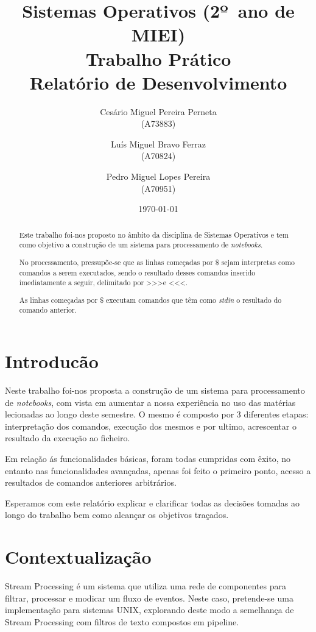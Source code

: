 \documentclass{report}
\title{Sistemas Operativos (2º\ ano de MIEI)\\ \textbf{Trabalho Prático  }\\ Relatório de Desenvolvimento}
\author{Cesário Miguel Pereira Perneta\\ (A73883) \and Luís Miguel Bravo Ferraz\\ (A70824) \and Pedro Miguel Lopes Pereira\\ (A70951) }
\date {\today }
\begin{document}
\maketitle

\begin{abstract}

\indent Este trabalho foi-nos proposto no âmbito da disciplina de Sistemas Operativos e tem como objetivo a construção de um sistema para processamento de \textit {notebooks}.

\indent No processamento, pressupõe-se que as linhas começadas por \$ sejam interpretas como comandos a serem executados, sendo o resultado desses comandos inserido imediatamente a seguir, delimitado por \textgreater\textgreater\textgreater e \textless\textless\textless.

\indent As linhas começadas por \$ \text{\textbar} executam comandos que têm como \textit {stdin} o resultado do comando anterior.

\end{abstract}

\tableofcontents
 \newpage
\chapter{Introducão}
\indent Neste trabalho foi-nos proposta a construção de um sistema para processamento de \textit {notebooks}, com vista em aumentar a nossa experiência no uso das matérias lecionadas ao longo deste semestre. O mesmo é composto por 3 diferentes etapas: interpretação dos comandos, execução dos mesmos e por ultimo, acrescentar o resultado da execução ao ficheiro.

\indent Em relação ás funcionalidades básicas, foram todas cumpridas com êxito, no entanto nas funcionalidades avançadas, apenas foi feito o primeiro ponto, acesso a resultados de comandos anteriores arbitrários.

\indent Esperamos com este relatório explicar e clarificar todas as decisões tomadas ao longo do trabalho bem como alcançar os objetivos traçados.



\newpage
\chapter{Contextualização}
Stream Processing é um sistema que utiliza uma rede de componentes para filtrar, processar e modicar um fluxo de eventos. Neste caso, pretende-se uma implementação para sistemas UNIX, explorando deste modo a semelhança de Stream Processing com filtros de texto compostos em pipeline.
\end{document}
